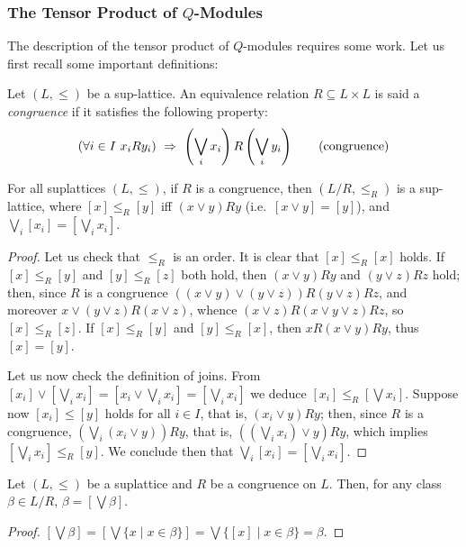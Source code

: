 \subsubsection{The Tensor Product of $Q$-Modules}

The description of the tensor product of $Q$-modules requires some work. Let us first recall some important definitions:

\begin{definition}
Let $(L, \leq)$ be a sup-lattice. An equivalence relation $R\subseteq L\times L$ is said a \emph{congruence} if it satisfies the following property:
\begin{align}
(\forall i\in I \ x_{i} Ry_{i})  \ \Rightarrow  \ \left( \bigvee_{i}x_{i} \right ) R\left(\bigvee_{i}y_{i}\right)
\tag{congruence}
\end{align}
\end{definition}

\begin{lemma}
For all suplattices $(L,\leq)$, if $R$ is a congruence, then $(L/R, \leq_{R})$ is a sup-lattice, where $[x]\leq_{R}[y]$ iff $(x\vee y) R y$ (i.e.~$[x\vee y]=[y]$), and $\bigvee_{i}[x_{i}]=\left [\bigvee_{i}x_{i}\right]$.
\end{lemma}
\begin{proof}
Let us check that $\leq_{R}$ is an order. It is clear that $[x]\leq_{R}[x]$ holds. If $[x]\leq_{R}[y]$ and $[y]\leq_{R}[z]$ both hold, then 
$(x\vee y)Ry$ and $(y\vee z)Rz$ hold; 
then, since $R$ is a congruence $((x\vee y)\vee (y\vee z)) R (y\vee z)R z$, and moreover $x \vee (y\vee z) R (x \vee z)$, whence 
$(x\vee z) R(x \vee y\vee z)R z$, so $[x]\leq_{R}[z]$.  
If $[x]\leq_{R}[y]$ and $[y]\leq_{R}[x]$, then 
$xR(x\vee y)R y$, thus $[x]=[y]$.

Let us now check the definition of joins. 
From $[x_{i}]\vee [\bigvee_{i}x_{i}]=[x_{i}\vee \bigvee_{i}x_{i}]= [\bigvee_{i}x_{i}]$ we deduce $[x_{i}]\leq_{R}[\bigvee x_{i}]$.
Suppose now $[x_{i}]\leq [y]$ holds for all $i\in I$, that is, 
$(x_{i}\vee y)Ry$; then, since $R$ is a congruence, 
$(\bigvee_{i}(x_{i}\vee y))R y$, that is, 
$((\bigvee_{i}x_{i})\vee y)Ry$, which implies 
$[\bigvee_{i}x_{i}]\leq_{R}[y]$. We conclude then that $\bigvee_{i}[x_{i}]=[\bigvee_{i}x_{i}]$.
\end{proof}


\begin{corollary}\label{cor:bigvee}
Let $(L,\leq)$ be a suplattice and $R$ be a congruence on $L$.
Then, for any class $\beta\in L/R$, $\beta= [\bigvee\beta]$.
\end{corollary}
\begin{proof}
$[\bigvee \beta]=[\bigvee\{ x \mid x\in \beta\}]= \bigvee \{[x]\mid x\in \beta\}=\beta$.
\end{proof}


